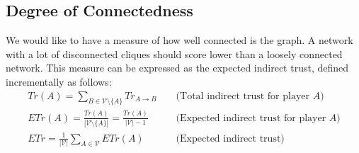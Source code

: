 \subsection{Degree of Connectedness}
  We would like to have a measure of how well connected is the graph. A network with a lot of disconnected cliques should
  score lower than a loosely connected network. This measure can be expressed as the expected indirect trust, defined
  incrementally as follows:
  \begin{align*}
    Tr(A) = \sum\limits_{B \in \mathcal{V} \setminus \{A\}}Tr_{A \rightarrow B} && \mbox{ (Total indirect trust for player
    }A\mbox{)} \\
    ETr\left(A\right) = \frac{Tr(A)}{|\mathcal{V} \setminus \{A\}|} = \frac{Tr(A)}{|\mathcal{V}| - 1} && \mbox{ (Expected
    indirect trust for player }A\mbox{)} \\
    ETr = \frac{1}{|\mathcal{V}|}\sum\limits_{A \in \mathcal{V}}ETr\left(A\right) && \mbox{ (Expected indirect trust)}
  \end{align*}
